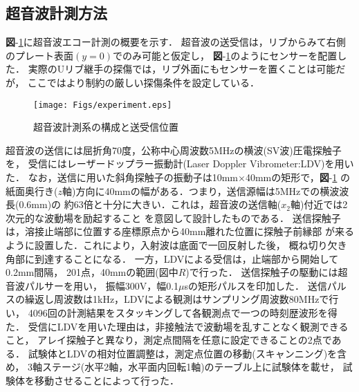 \subsection{超音波計測方法}
{\bf 図}-\ref{fig:experiment}に超音波エコー計測の概要を示す．
超音波の送受信は，リブからみて右側のプレート表面$(y=0)$でのみ可能と仮定し，
{\bf 図}-\ref{fig:experiment}のようにセンサーを配置した．
実際のUリブ継手の探傷では，リブ外面にもセンサーを置くことは可能だが，
ここではより制約の厳しい探傷条件を設定している．
\begin{figure}[thb]
\centering
	\texttt{[image: Figs/experiment.eps]}
	\caption{超音波計測系の構成と送受信位置}
	\label{fig:experiment}
\end{figure}
超音波の送信には屈折角70度，公称中心周波数5MHzの横波(SV波)圧電探触子を，
受信にはレーザードップラー振動計(Laser Doppler Vibrometer:LDV)を用いた．
%
なお，送信に用いた斜角探触子の振動子は10mm$\times$40mmの矩形で，{\bf 図}-\ref{fig:experiment}
の紙面奥行き($z$軸)方向に40mmの幅がある．つまり，送信源幅は5MHzでの横波波長(0.6mm)の
約63倍と十分に大きい．これは，超音波の送信軸($x_2$軸)付近では2次元的な波動場を励起すること
を意図して設計したものである．
%
送信探触子は，溶接止端部に位置する座標原点から40mm離れた位置に探触子前縁部
が来るように設置した．これにより，入射波は底面で一回反射した後，
概ね切り欠き角部に到達することになる．
一方，LDVによる受信は，止端部から開始して0.2mm間隔，
201点，40mmの範囲(図中$R$)で行った．
送信探触子の駆動には超音波パルサーを用い，
振幅300V，幅0.1$\mu$sの矩形パルスを印加した．
%
送信パルスの繰返し周波数は1kHz，LDVによる観測はサンプリング周波数80MHzで行い，
4096回の計測結果をスタッキングして各観測点で一つの時刻歴波形を得た．
%
受信にLDVを用いた理由は，非接触法で波動場を乱すことなく観測できること，
アレイ探触子と異なり，測定点間隔を任意に設定できることの2点である．
試験体とLDVの相対位置調整は，測定点位置の移動(スキャンニング)を含め，
3軸ステージ(水平2軸，水平面内回転1軸)のテーブル上に試験体を載せ，
試験体を移動させることによって行った．
